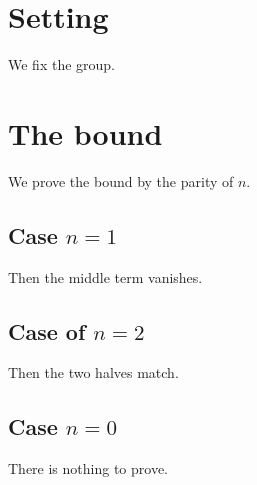 \documentclass{article}
\begin{document}
\section{Setting}
We fix the group.
\section{The bound}
We prove the bound by the parity of $n$.
\subsection{Case $n=1$}
Then the middle term vanishes.
\subsection{Case of $n=2$}
Then the two halves match.
\subsection*{Case $n=0$}
There is nothing to prove.
\end{document}
